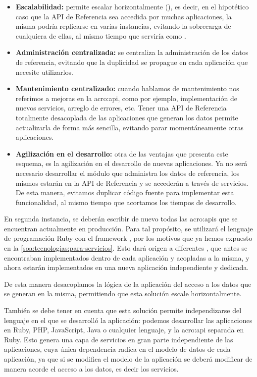 \begin{itemize}
  \item \textbf{Escalabilidad:} permite escalar horizontalmente (), es decir, en el hipotético caso que la API de Referencia sea accedida por muchas aplicaciones, la misma podría replicarse en varias instancias, evitando la sobrecarga de cualquiera de ellas, al mismo tiempo que serviría como .

  \item \textbf{Administración centralizada:} se centraliza la administración de los datos de referencia, evitando que la duplicidad se propague en cada aplicación que necesite utilizarlos.

  \item \textbf{Mantenimiento centralizado:} cuando hablamos de mantenimiento nos referimos a mejoras en la \gls{acro:api}, como por ejemplo, implementación de nuevos servicios, arreglo de errores, etc. Tener una API de Referencia totalmente desacoplada de las aplicaciones que generan los datos permite actualizarla de forma más sencilla, evitando parar momentáneamente otras aplicaciones.

  \item \textbf{Agilización en el desarrollo:} otra de las ventajas que presenta este esquema, es la agilización en el desarrollo de nuevas aplicaciones. Ya no será necesario desarrollar el módulo que administra los datos de referencia, los mismos estarán en la API de Referencia y se accederán a través de servicios.  De esta manera, evitamos duplicar código fuente para implementar esta funcionalidad, al mismo tiempo que acortamos los tiempos de desarrollo.
\end{itemize}

En segunda instancia, se deberán escribir de nuevo todas las \glspl{acro:api} que se encuentran actualmente en producción. Para tal propósito, se utilizará el lenguaje de programación Ruby con el framework , por los motivos que ya hemos expuesto en la \autoref{soa:tecnologias:para-servicios}. Esto dará origen a diferentes , que antes se encontraban implementados dentro de cada aplicación y acopladas a la misma, y ahora estarán implementados en una nueva aplicación independiente y dedicada.

De esta manera desacoplamos la lógica de la aplicación del acceso a los datos que se generan en la misma, permitiendo que esta solución escale horizontalmente.

También se debe tener en cuenta que esta solución permite independizarse del lenguaje en el que se desarrolló la aplicación: podemos desarrollar las aplicaciones en Ruby, PHP, JavaScript, Java o cualquier lenguaje, y la \gls{acro:api} separada en Ruby. Esto genera una capa de servicios en gran parte independiente de las aplicaciones, cuya única dependencia radica en el modelo de datos de cada aplicación, ya que si se modifica el modelo de la aplicación se deberá modificar de manera acorde el acceso a los datos, es decir los servicios.


